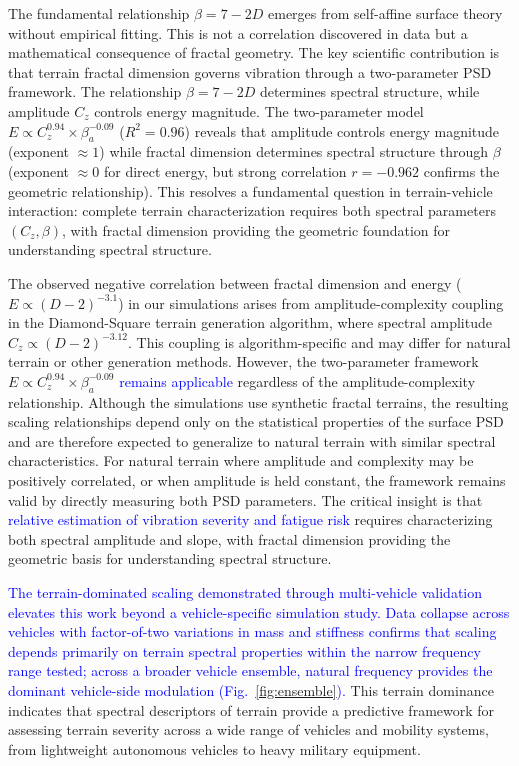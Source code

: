 \documentclass[11pt]{article}
\begin{document}
The fundamental relationship $\beta = 7-2D$ emerges from self-affine surface theory without empirical fitting\cite{Mandelbrot1982,Turcotte1997}. This is not a correlation discovered in data but a mathematical consequence of fractal geometry. The key scientific contribution is that terrain fractal dimension governs vibration through a two-parameter PSD framework. The relationship $\beta = 7-2D$ determines spectral structure, while amplitude $C_z$ controls energy magnitude. The two-parameter model $E \propto C_z^{0.94} \times \beta_a^{-0.09}$ ($R^2 = 0.96$) reveals that amplitude controls energy magnitude (exponent $\approx 1$) while fractal dimension determines spectral structure through $\beta$ (exponent $\approx 0$ for direct energy, but strong correlation $r=-0.962$ confirms the geometric relationship). This resolves a fundamental question in terrain-vehicle interaction: complete terrain characterization requires both spectral parameters $(C_z, \beta)$, with fractal dimension providing the geometric foundation for understanding spectral structure.

The observed negative correlation between fractal dimension and energy ($E \propto (D-2)^{-3.1}$) in our simulations arises from amplitude-complexity coupling in the Diamond-Square terrain generation algorithm, where spectral amplitude $C_z \propto (D-2)^{-3.12}$. This coupling is algorithm-specific and may differ for natural terrain or other generation methods. However, the two-parameter framework $E \propto C_z^{0.94} \times \beta_a^{-0.09}$ \textcolor{blue}{remains applicable} regardless of the amplitude-complexity relationship. Although the simulations use synthetic fractal terrains, the resulting scaling relationships depend only on the statistical properties of the surface PSD and are therefore expected to generalize to natural terrain with similar spectral characteristics. For natural terrain where amplitude and complexity may be positively correlated, or when amplitude is held constant, the framework remains valid by directly measuring both PSD parameters. The critical insight is that \textcolor{blue}{relative estimation of vibration severity and fatigue risk} requires characterizing both spectral amplitude and slope, with fractal dimension providing the geometric basis for understanding spectral structure.

\textcolor{blue}{The terrain-dominated scaling demonstrated through multi-vehicle validation elevates this work beyond a vehicle-specific simulation study. Data collapse across vehicles with factor-of-two variations in mass and stiffness confirms that scaling depends primarily on terrain spectral properties within the narrow frequency range tested; across a broader vehicle ensemble, natural frequency provides the dominant vehicle-side modulation (Fig.~\ref{fig:ensemble}).} This terrain dominance indicates that spectral descriptors of terrain provide a predictive framework for assessing terrain severity across a wide range of vehicles and mobility systems, from lightweight autonomous vehicles to heavy military equipment.
\end{document}

